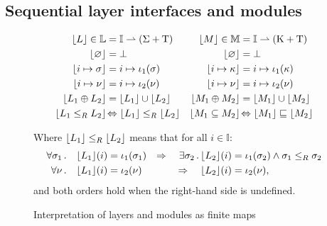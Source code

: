 \subsection{Sequential layer interfaces and modules}
\begin{figure}[t]
    \begin{align*}
        \lfloor L \rfloor \in \mathbb{L} &=
            \mathbb{I} \rightharpoonup (\Sigma + \mathrm{T}) &
        \lfloor M \rfloor \in \mathbb{M} &=
            \mathbb{I} \rightharpoonup (\mathrm{K} + \mathrm{T}) \\
        \lfloor \varnothing \rfloor &=
            \bot &
        \lfloor \varnothing \rfloor &=
            \bot \\
        \lfloor i \mapsto \sigma \rfloor &=
            i \mapsto \iota_1(\sigma) &
        \lfloor i \mapsto \kappa \rfloor &=
            i \mapsto \iota_1(\kappa) \\
        \lfloor i \mapsto \nu \rfloor &=
            i \mapsto \iota_2(\nu) &
        \lfloor i \mapsto \nu \rfloor &=
            i \mapsto \iota_2(\nu) \\
        \lfloor L_1 \oplus L_2 \rfloor &=
            \lfloor L_1 \rfloor \cup \lfloor L_2 \rfloor &
        \lfloor M_1 \oplus M_2 \rfloor &=
            \lfloor M_1 \rfloor \cup \lfloor M_2 \rfloor \\
        \lfloor L_1 \le_{R} L_2 \rfloor &\!\Leftrightarrow
            \lfloor L_1 \rfloor \le_{R} \lfloor L_2 \rfloor &
        \lfloor M_1 \subseteq M_2 \rfloor &\!\Leftrightarrow
            \lfloor M_1 \rfloor \sqsubseteq \lfloor M_2 \rfloor
    \end{align*}
    \begin{center}
    Where $\lfloor L_1 \rfloor \le_{R} \lfloor L_2 \rfloor$ means that for all $i \in \mathbb{I}$:
    \begin{align*}
        \forall \sigma_1 \, . \quad
            \lfloor L_1 \rfloor (i) &= \iota_1(\sigma_1) &\Rightarrow\quad
        \exists \sigma_2 \, . \,
            \lfloor L_2 \rfloor (i) &= \iota_1(\sigma_2) \wedge
            \sigma_1 \le_{R} \sigma_2 \\
        \forall \nu \, . \quad
             \lfloor L_1 \rfloor (i) &= \iota_2(\nu) &\Rightarrow\quad
             \lfloor L_2 \rfloor (i) &= \iota_2(\nu),
    \end{align*}
    and both orders hold when the right-hand side is undefined.
    \end{center}
    \caption{Interpretation of layers and modules as finite maps}
    \label{fig:fmap-layers}
\hrulefill
    \afterpage{\FloatBarrier}
\end{figure}

